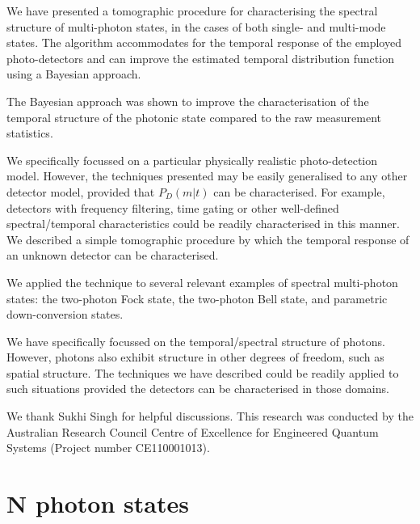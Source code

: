 \documentclass[aps,pra,twocolumn,amsmath,amssymb,color,superscriptaddress]{revtex4}
\begin{document}
We have presented a tomographic procedure for characterising the spectral structure of multi-photon states, in the cases of both single- and multi-mode states. The algorithm accommodates for the temporal response of the employed photo-detectors and can improve the estimated temporal distribution function using a Bayesian approach.

The Bayesian approach was shown to improve the characterisation of the temporal structure of the photonic state compared to the raw measurement statistics.

We specifically focussed on a particular physically realistic photo-detection model. However, the techniques presented may be easily generalised to any other detector model, provided that $P_D(m|t)$ can be characterised. For example, detectors with frequency filtering, time gating or other well-defined spectral/temporal characteristics could be readily characterised in this manner. We described a simple tomographic procedure by which the temporal response of an unknown detector can be characterised.

We applied the technique to several relevant examples of spectral multi-photon states: the two-photon Fock state, the two-photon Bell state, and parametric down-conversion states.

We have specifically focussed on the temporal/spectral structure of photons. However, photons also exhibit structure in other degrees of freedom, such as spatial structure. The techniques we have described could be readily applied to such situations provided the detectors can be characterised in those domains.

%
%

\begin{acknowledgments}
We thank Sukhi Singh for helpful discussions. This research was conducted by the Australian Research Council Centre of Excellence for Engineered Quantum Systems (Project number CE110001013).
\end{acknowledgments}

%
%



%
%
\onecolumngrid
\appendix

\section{N photon states}
\end{document}
